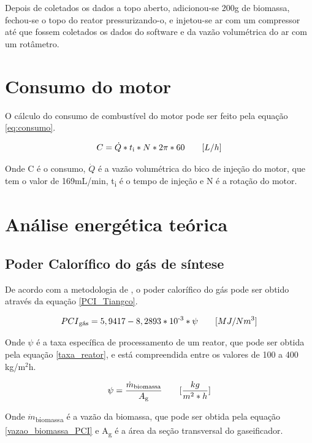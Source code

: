 Depois de coletados os dados a topo aberto, adicionou-se 200g de biomassa, fechou-se o topo do reator pressurizando-o, e injetou-se ar com um compressor até que fossem coletados os dados do software e da vazão volumétrica do ar com um rotâmetro.

\section{Consumo do motor}

O cálculo do consumo de combustível do motor pode ser feito pela equação \ref{eq:consumo}.

\begin{equation} \label{eq:consumo}
	C = \dot{Q} * t\textsubscript{i} * N * {2 \pi*60} \qquad [L/h]
\end{equation}

Onde C é o consumo,
$\dot{Q}$ é a vazão volumétrica do bico de injeção do motor, que tem o valor de 169mL/min,
t\textsubscript{i} é o tempo de injeção e
N é a rotação do motor.

\section{Análise energética teórica}
\subsection{Poder Calorífico do gás de síntese}

De acordo com a metodologia de \cite{tiangco1986}, o poder calorífico do gás pode ser obtido através da equação \ref{PCI_Tiangco}.

\begin{equation} \label{PCI_Tiangco}
	PCI\textsubscript{gás} = 5,9417 - 8,2893*10\textsuperscript{-3} * \psi \qquad [MJ/Nm^3]
\end{equation}

Onde $\psi$ é a taxa específica de processamento de um reator, que pode ser obtida pela equação \ref{taxa_reator}, e está compreendida entre os valores de 100 a 400 kg/m$^2$h.

\begin{equation} \label{taxa_reator}
	\psi = \frac{\dot{m}\textsubscript{biomassa}}{A\textsubscript{g}} \qquad [\frac{kg}{m^2*h}]
\end{equation}

Onde $\dot{m}$\textsubscript{biomassa} é a vazão da biomassa, que pode ser obtida pela equação \ref{vazao_biomassa_PCI} e A\textsubscript{g} é a área da seção transversal do gaseificador.

